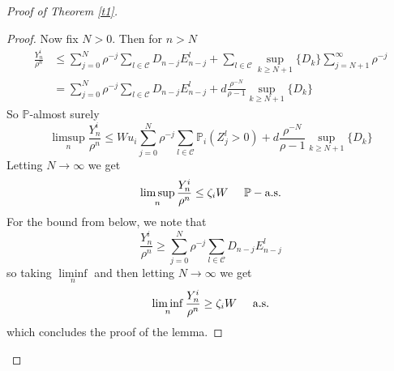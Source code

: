 \documentclass[12pt]{article}
\numberwithin{equation}{section}
\begin{document}
\begin{proof}[Proof of Theorem \ref{t1}]
\begin{proof}
Now fix $N>0$. Then for $n>N$
\begin{align*}
     \frac {Y^i_n} {\rho^n} &\leq \sum_{j=0}^{N} \rho^{-j}  \sum_{l \in \mathcal{C}} D_{n-j} E^l_{n-j} +  \sum_{l \in \mathcal{C}}\sup_{k\geq N+1}\{D_k \}\sum_{j=N+1}^\infty \rho^{-j}  \\&=  \sum_{j=0}^{N} \rho^{-j}  \sum_{l \in \mathcal{C}} D_{n-j} E^l_{n-j} +  d\frac {\rho^{-N}} {\rho - 1} \sup_{k\geq N+1}\{D_k \}
\end{align*}
So $\mathbb{P}$-almost surely
\[
\limsup_{n} \frac {Y^i_n} {\rho^n} \leq W u_i\sum_{j=0}^{N}  \rho^{-j}  \sum_{l \in \mathcal{C}} \mathbb{P}_i(Z^l_j > 0) + d\frac {\rho^{-N}} {\rho - 1} \sup_{k\geq N+1}\{D_k \}
\]
Letting $N \rightarrow \infty$ we get 
\[
\limsup_{n} \frac {Y^i_n} {\rho^n} \leq \zeta_iW \hspace{0.5cm} \mathbb{P}-\text{a.s.}
\]
For the bound from below, we note that
\[
    \frac {Y^i_n} {\rho^n} \geq \sum_{j=0}^{N}\rho^{-j}  \sum_{l \in \mathcal{C}} D_{n-j} E^l_{n-j} 
\]
so taking $\liminf\limits_n$ and then letting $N \rightarrow \infty$ we get
\[
\liminf_{n} \frac {Y^i_n} {\rho^n} \geq \zeta_iW \hspace{0.5cm} \text{a.s.}
\]
which concludes the proof of the lemma.
\end{proof}


\end{proof}
\end{document}

